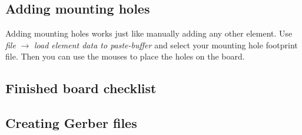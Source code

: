 \subsection{Adding mounting holes}
Adding mounting holes works just like manually adding any other element.  Use \textsl{file} $\rightarrow$ \textsl{load element data to paste-buffer} and select your mounting hole footprint file.  Then you can use the mouses to place the holes on the board.

\clearpage
\subsection{Finished board checklist}


\clearpage
\subsection{Creating Gerber files}


